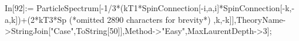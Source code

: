 In[92]:= ParticleSpectrum[-1/3*(kT1*SpinConnection[-i,a,i]*SpinConnection[-k,-a,k])+(2*kT3*Sp (*omitted 2890 characters for brevity*) ,k,-k]],TheoryName->StringJoin["Case",ToString[50]],Method->"Easy",MaxLaurentDepth->3];
